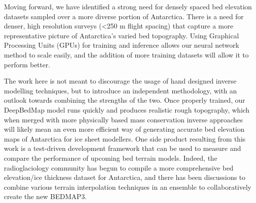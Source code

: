 \documentclass[tc, manuscript]{copernicus}
\begin{document}
Moving forward, we have identified a strong need for densely spaced bed elevation datasets sampled over a more diverse portion of Antarctica.
There is a need for denser, high resolution surveys (<250 m flight spacing) that capture a more representative picture of Antarctica's varied bed topography.
Using Graphical Processing Units (GPUs) for training and inference allows our neural network method to scale easily, and the addition of more training datasets will allow it to perform better.

The work here is not meant to discourage the usage of hand designed inverse modelling techniques, but to introduce an independent methodology, with an outlook towards combining the strengths of the two.
Once properly trained, our DeepBedMap model runs quickly and produces realistic rough topography, which when merged with more physically based mass conservation inverse approaches \citep[e.g.][]{MorlighemDeepglacialtroughs2019} will likely mean an even more efficient way of generating accurate bed elevation maps of Antarctica for ice sheet modellers.
One side product resulting from this work is a test-driven development framework that can be used to measure and compare the performance of upcoming bed terrain models.
Indeed, the radioglaciology community has begun to compile a more comprehensive bed elevation/ice thickness dataset for Antarctica, and there has been discussions to combine various terrain interpolation techniques in an ensemble to collaboratively create the new BEDMAP3.





\end{document}
